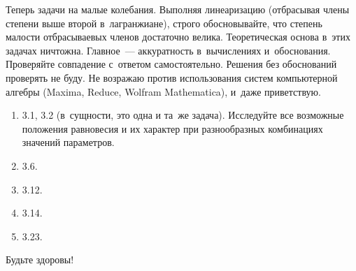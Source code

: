 \documentclass[a4paper,11pt]{article}
\theoremstyle{definition}
\begin{document}
Теперь задачи на малые колебания. Выполняя линеаризацию (отбрасывая члены
степени выше второй в~лагранжиане), строго обосновывайте, что степень малости
отбрасываевых членов достаточно велика. Теоретическая основа в~этих задачах
ничтожна. Главное~— аккуратность в~вычислениях и~обоснования. Проверяйте
совпадение с~ответом самостоятельно. Решения без обоснований проверять не буду.
Не возражаю против использования систем компьютерной алгебры (Maxima, Reduce,
Wolfram Mathematica), и~даже приветствую.

\begin{enumerate}

\item
3.1, 3.2 (в~сущности, это одна и та~же задача). Исследуйте все возможные
положения равновесия и их характер при разнообразных комбинациях значений
параметров.

\item
3.6.

\item
3.12.

\item
3.14.

\item
3.23.

\end{enumerate}

Будьте здоровы!
\end{document}

